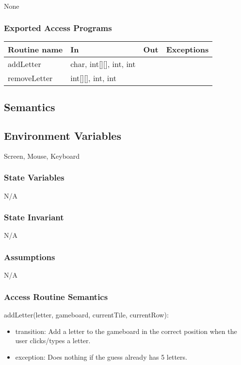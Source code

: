 \documentclass[12pt]{article}
\begin{document}
None

\subsubsection* {Exported Access Programs}

\begin{tabular}{| l | l | l | p{6cm} |}
\hline
\textbf{Routine name} & \textbf{In} & \textbf{Out} & \textbf{Exceptions}\\
\hline
addLetter & char, int[][], int, int & ~ &  \\
\hline
removeLetter & int[][], int, int & ~ &  \\
\hline
\end{tabular}

\subsection* {Semantics}

\subsection*{Environment Variables}

Screen, Mouse, Keyboard

\subsubsection* {State Variables}
N/A

\subsubsection* {State Invariant}

N/A

\subsubsection* {Assumptions}

N/A

\subsubsection* {Access Routine Semantics}

\noindent addLetter(letter, gameboard, currentTile, currentRow):
\begin{itemize}
  \item transition: Add a letter to the gameboard in the correct position when the user clicks/types a letter. 
 \item exception: Does nothing if the guess already has 5 letters.
\end{itemize}
\end{document}
